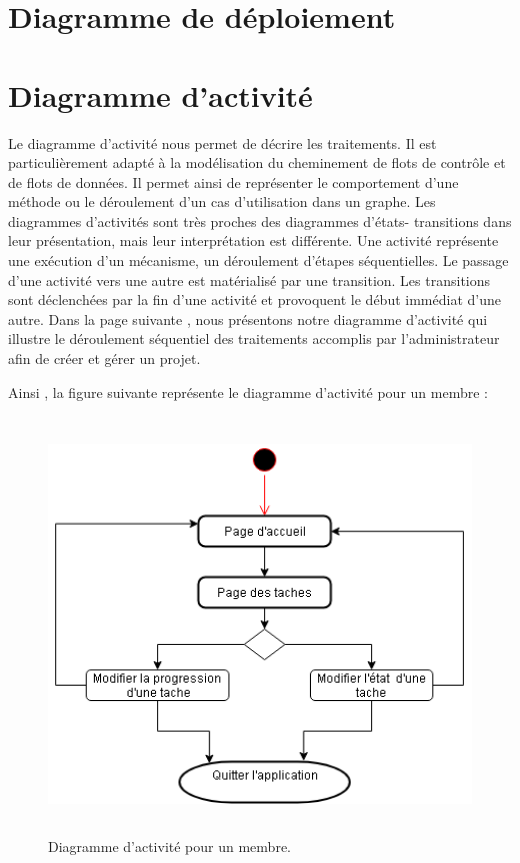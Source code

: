 \newpage



\section{Diagramme de d\'{e}ploiement }



\section{Diagramme d'activit\'{e}}
Le diagramme d'activit\'{e} nous permet de d\'{e}crire les traitements. Il est
particuli\`{e}rement adapt\'{e} \`{a} la mod\'{e}lisation du cheminement de flots de
contr\^{o}le et de flots de donn\'{e}es. Il permet ainsi de repr\'{e}senter le
comportement d'une m\'{e}thode ou le d\'{e}roulement d'un cas d'utilisation dans
un graphe.
Les diagrammes d'activit\'{e}s sont tr\`{e}s proches des diagrammes d'\'{e}tats-
transitions dans leur pr\'{e}sentation, mais leur interpr\'{e}tation est diff\'{e}rente.
Une activit\'{e} repr\'{e}sente une ex\'{e}cution d'un m\'{e}canisme, un d\'{e}roulement
d'\'{e}tapes s\'{e}quentielles. Le passage d'une activit\'{e} vers une autre est mat\'{e}rialis\'{e}
par une transition.
Les transitions sont d\'{e}clench\'{e}es par la fin d'une activit\'{e} et provoquent le
d\'{e}but imm\'{e}diat d'une autre.
Dans la page suivante , nous pr\'{e}sentons notre diagramme d'activit\'{e} qui illustre le
d\'{e}roulement s\'{e}quentiel des traitements accomplis par l'administrateur afin de
cr\'{e}er et g\'{e}rer un projet.



Ainsi , la figure suivante représente le diagramme d'activit\'{e} pour un membre :
\begin{figure}[H]
\center
\includegraphics[width=13cm,height=11cm]{./figures/activity_m.png}
\caption{Diagramme d'activit\'{e} pour un membre.}

\end{figure}
\FloatBarrier



